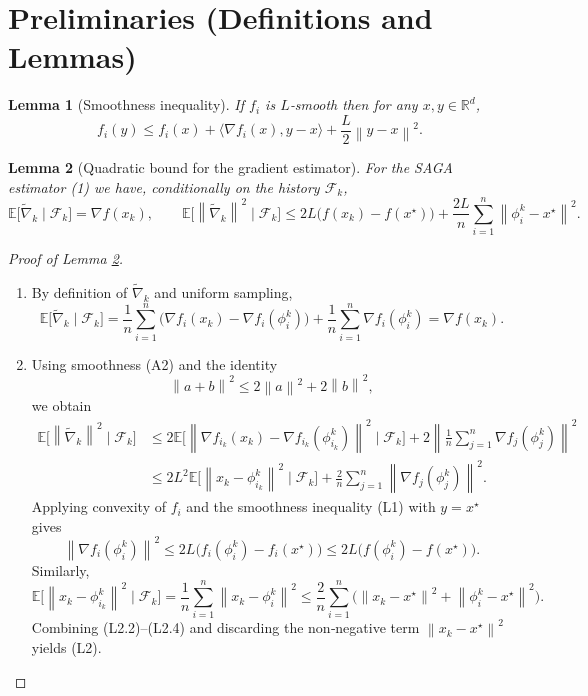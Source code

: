 \documentclass{article}
\newtheorem{lemma}{Lemma}
\newcommand{\E}{\mathbb{E}}
\newcommand{\norm}[1]{\left\|#1\right\|}
\newcommand{\R}{\mathbb{R}}
\begin{document}
\newpage
\section*{Preliminaries (Definitions and Lemmas)}
\begin{lemma}[Smoothness inequality]\label{lem:smooth}
If $f_i$ is $L$‑smooth then for any $x,y\in\R^d$,
\[
f_i(y)\le f_i(x)+\langle\nabla f_i(x),y-x\rangle+\frac{L}{2}\norm{y-x}^2 .
\tag{L1}
\]
\end{lemma}
\begin{lemma}[Quadratic bound for the gradient estimator]\label{lem:varbound}
For the SAGA estimator (1) we have, conditionally on the history $\mathcal{F}_k$,
\[
\E\!\big[\tilde{\nabla}_k\mid\mathcal{F}_k\big]=\nabla f(x_k),\qquad
\E\!\big[\norm{\tilde{\nabla}_k}^2\mid\mathcal{F}_k\big]\le 2L\Big(f(x_k)-f(x^\star)\Big)+\frac{2L}{n}\sum_{i=1}^{n}\norm{\phi_i^k-x^\star}^2 .
\tag{L2}
\]
\end{lemma}
\begin{proof}[Proof of Lemma \ref{lem:varbound}]
\begin{enumerate}
\item[\textbf{Unbiasedness}] By definition of $\tilde{\nabla}_k$ and uniform sampling,
\[
\E\!\big[\tilde{\nabla}_k\mid\mathcal{F}_k\big]
 =\frac1n\sum_{i=1}^{n}\big(\nabla f_i(x_k)-\nabla f_i(\phi_i^k)\big)+\frac1n\sum_{i=1}^{n}\nabla f_i(\phi_i^k)=\nabla f(x_k).
\tag{L2.1}
\]
\item[\textbf{Second moment}] Using smoothness (A2) and the identity
\[
\norm{a+b}^2\le 2\norm{a}^2+2\norm{b}^2,
\]
we obtain
\[
\begin{aligned}
\E\!\big[\norm{\tilde{\nabla}_k}^2\mid\mathcal{F}_k\big]
 &\le 2\E\!\big[\norm{\nabla f_{i_k}(x_k)-\nabla f_{i_k}(\phi_{i_k}^k)}^2\mid\mathcal{F}_k\big]
   +2\norm{\tfrac1n\sum_{j=1}^{n}\nabla f_j(\phi_j^k)}^2\\
 &\le 2L^2\E\!\big[\norm{x_k-\phi_{i_k}^k}^2\mid\mathcal{F}_k\big]
   +\frac{2}{n}\sum_{j=1}^{n}\norm{\nabla f_j(\phi_j^k)}^2 .
\end{aligned}
\tag{L2.2}
\]
Applying convexity of $f_i$ and the smoothness inequality (L1) with $y=x^\star$ gives
\[
\norm{\nabla f_i(\phi_i^k)}^2\le 2L\big(f_i(\phi_i^k)-f_i(x^\star)\big)
\le 2L\big(f(\phi_i^k)-f(x^\star)\big).
\tag{L2.3}
\]
Similarly,
\[
\E\!\big[\norm{x_k-\phi_{i_k}^k}^2\mid\mathcal{F}_k\big]=\frac1n\sum_{i=1}^{n}\norm{x_k-\phi_i^k}^2
\le\frac{2}{n}\sum_{i=1}^{n}\Big(\norm{x_k-x^\star}^2+\norm{\phi_i^k-x^\star}^2\Big).
\tag{L2.4}
\]
Combining (L2.2)–(L2.4) and discarding the non‑negative term $\norm{x_k-x^\star}^2$ yields (L2). \qedhere
\end{enumerate}
\end{proof}
\end{document}
